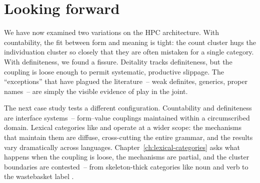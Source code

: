 \section{Looking forward}
\label{sec:10:transition}

We have now examined two variations on the HPC architecture. With countability, the fit between form and meaning is tight: the count cluster hugs the individuation cluster so closely that they are often mistaken for a single category. With definiteness, we found a fissure. Deitality tracks definiteness, but the coupling is loose enough to permit systematic, productive slippage. The \enquote{exceptions} that have plagued the literature~-- weak definites, generics, proper names~-- are simply the visible evidence of play in the joint.

The next case study tests a different configuration. Countability and definiteness are interface systems~-- form--value couplings maintained within a circumscribed domain. Lexical categories like  and  operate at a wider scope: the mechanisms that maintain them are diffuse, cross-cutting the entire grammar, and the results vary dramatically across languages. Chapter~\ref{ch:lexical-categories} asks what happens when the coupling is loose, the mechanisms are partial, and the cluster boundaries are contested~-- from skeleton-thick categories like noun and verb to the wastebasket label .
